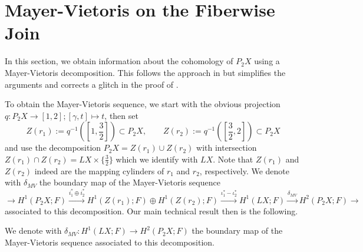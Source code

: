 \documentclass[a4paper,twoside]{article}
\theoremstyle{plain}
\theoremstyle{definition}
\theoremstyle{remark}
\begin{document}
\section{Mayer-Vietoris on the Fiberwise Join}

In this section, we obtain information about the cohomology of $P_2X$ using a
Mayer-Vietoris decomposition. This follows the approach in \cite[Section
3]{GrantMescher} but simplifies the arguments and corrects a glitch in the
proof of \cite[Theorem 3.5]{GrantMescher}.

To obtain the Mayer-Vietoris sequence, we start with the obvious projection
$q\colon P_2X\to [1,2]; [\gamma,t]\mapsto t$, then set
\begin{equation*}
  Z(r_1):= q^{-1}\left(\left[1, \frac{3}{2}\right]\right)\subset P_2X,
  \qquad
  Z(r_2):= q^{-1}\left(\left[\frac{3}{2},2\right]\right)\subset P_2X
\end{equation*}
and use the
decomposition $P_2X = Z(r_1)\cup Z(r_2)$ with intersection $Z(r_1)\cap Z(r_2)
= LX\times \{\frac{3}{2}\}$ which we identify with $LX$. Note that $Z(r_1)$ and
$Z(r_2)$ indeed are the mapping cylinders of $r_1$ and $r_2$, respectively.
We denote with $\delta_{MV}$ the boundary map of the Mayer-Vietoris sequence
\begin{equation*}
  \xrightarrow{} H^1(P_2X;F) \xrightarrow{i_1^*\oplus i_2^*}
  H^1(Z(r_1);F)\oplus H^1(Z(r_2);F) \xrightarrow{ \iota_1^*
  -\iota_2^*} H^1(LX;F) \xrightarrow{\delta_{MV}} H^2(P_2X;F) \xrightarrow{}
\end{equation*}
associated to this decomposition.
Our main technical result then is the following.

We denote with $\delta_{MV}\colon H^1(LX;F) \to H^2(P_2X;F)$ the boundary map
of the Mayer-Vietoris sequence associated to this decomposition.
\end{document}
